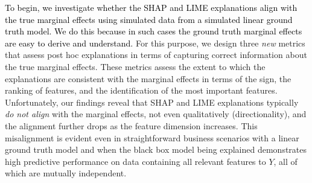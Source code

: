 \documentclass[mnsc,blindrev]{informs3}
\begin{document}
\textcolor{black}{To begin, we investigate whether the SHAP and LIME explanations align with the true marginal effects using simulated data from a simulated linear ground truth model. We do this because in such cases the ground truth marginal effects are easy to derive and understand.} For this purpose, we design three \textit{new} metrics that assess post hoc explanations in terms of capturing correct information about the true marginal effects. %
These metrics assess the extent to which the explanations are consistent with the marginal effects in terms of the sign, the ranking of features, and the identification of the most important features. %
Unfortunately, our findings reveal that SHAP and LIME explanations typically \textit{do not align} with the marginal effects, not even qualitatively (directionality), and the alignment further drops as the feature dimension increases. This misalignment is evident even in straightforward business scenarios with a linear ground truth model and when the black box model being explained demonstrates high predictive performance on data containing all relevant features to $Y$, all of which are mutually independent. 
\end{document}
